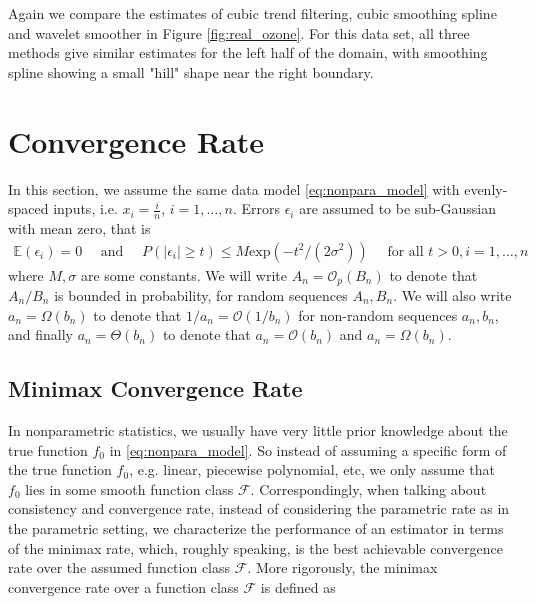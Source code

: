 \documentclass[a4paper]{article}
\renewcommand{\cal}{\mathcal}
\newcommand{\E}{\mathbb{E}}
\begin{document}
Again we compare the estimates of cubic trend filtering, cubic smoothing spline and wavelet smoother in Figure \ref{fig:real_ozone}. For this data set, all three methods give similar estimates for the left half of the domain, with smoothing spline showing a small "hill" shape near the right boundary.

\section{Convergence Rate}
\label{sec:theory}
In this section, we assume the same data model \eqref{eq:nonpara_model} with evenly-spaced inputs, i.e. $x_i = \frac{i}{n}$, $i = 1,\ldots, n$. Errors $\epsilon_i$ are assumed to be sub-Gaussian with mean zero, that is
\begin{align*}
\E(\epsilon_i) = 0 \quad \text{ and } \quad P(|\epsilon_i|\geq t) \leq M\mbox{exp}(-t^2/(2\sigma^2)) \quad \text{ for all } t>0, i=1,\ldots, n
\end{align*}
where $M, \sigma$ are some constants. We will write $A_n = \cal{O}_p(B_n)$ to denote that $A_n/B_n$ is bounded in probability, for random sequences $A_n,B_n$. We will also write $a_n = \Omega(b_n)$ to denote that $1/a_n = \cal{O}(1/b_n)$ for non-random sequences $a_n, b_n$, and finally $a_n = \Theta(b_n)$ to denote that $a_n = \cal{O}(b_n)$ and $a_n = \Omega(b_n)$.

\subsection{Minimax Convergence Rate}
\label{subsec:minimax_rate}
In nonparametric statistics, we usually have very little prior knowledge about the true function $f_0$ in \eqref{eq:nonpara_model}. So instead of assuming a specific form of the true function $f_0$, e.g. linear, piecewise polynomial, etc, we only assume that $f_0$ lies in some smooth function class $\cal{F}$. Correspondingly, when talking about consistency and convergence rate, instead of considering the parametric rate as in the parametric setting, we characterize the performance of an estimator in terms of the minimax rate, which, roughly speaking, is the best achievable convergence rate over the assumed function class $\cal{F}$. More rigorously, the minimax convergence rate over a function class $\cal{F}$ is defined as
\end{document}
